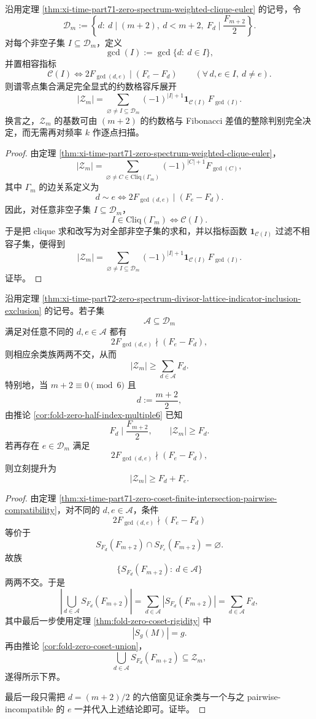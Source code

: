 \begin{theorem}[谱零点集合的约数格指标容斥公式]\label{thm:xi-time-part72-zero-spectrum-divisor-lattice-indicator-inclusion-exclusion}
沿用定理 \ref{thm:xi-time-part71-zero-spectrum-weighted-clique-euler} 的记号，令
\[
\mathcal D_m:=
\left\{
d:\ d\mid (m+2),\ d<m+2,\ F_d\mid \frac{F_{m+2}}{2}
\right\}.
\]
对每个非空子集 \(I\subseteq \mathcal D_m\)，定义
\[
\gcd(I):=\gcd\{d:\ d\in I\},
\]
并置相容指标
\[
\mathcal C(I)
\iff
2F_{\gcd(d,e)}\mid (F_e-F_d)
\qquad
(\forall\, d,e\in I,\ d\neq e).
\]
则谱零点集合满足完全显式的约数格容斥展开
\[
|\mathcal Z_m|
=
\sum_{\varnothing\neq I\subseteq \mathcal D_m}
(-1)^{|I|+1}\mathbf 1_{\mathcal C(I)}\,F_{\gcd(I)}.
\]
换言之，\(\mathcal Z_m\) 的基数可由 \((m+2)\) 的约数格与 Fibonacci 差值的整除判别完全决定，而无需再对频率 \(k\) 作逐点扫描。
\end{theorem}
\begin{proof}
由定理 \ref{thm:xi-time-part71-zero-spectrum-weighted-clique-euler}，
\[
|\mathcal Z_m|
=
\sum_{\varnothing\neq C\in \mathrm{Cliq}(\Gamma_m)}
(-1)^{|C|+1}F_{\gcd(C)},
\]
其中 \(\Gamma_m\) 的边关系定义为
\[
d\sim e
\iff
2F_{\gcd(d,e)}\mid (F_e-F_d).
\]
因此，对任意非空子集 \(I\subseteq \mathcal D_m\)，
\[
I\in \mathrm{Cliq}(\Gamma_m)
\iff
\mathcal C(I).
\]
于是把 clique 求和改写为对全部非空子集的求和，并以指标函数 \(\mathbf 1_{\mathcal C(I)}\) 过滤不相容子集，便得到
\[
|\mathcal Z_m|
=
\sum_{\varnothing\neq I\subseteq \mathcal D_m}
(-1)^{|I|+1}\mathbf 1_{\mathcal C(I)}\,F_{\gcd(I)}.
\]
证毕。
\end{proof}

\begin{corollary}\label{cor:xi-time-part72-zero-spectrum-pairwise-incompatible-linear-lower-bound}
沿用定理 \ref{thm:xi-time-part72-zero-spectrum-divisor-lattice-indicator-inclusion-exclusion} 的记号。若子集
\[
\mathcal A\subseteq \mathcal D_m
\]
满足对任意不同的 \(d,e\in\mathcal A\) 都有
\[
2F_{\gcd(d,e)}\nmid (F_e-F_d),
\]
则相应余类族两两不交，从而
\[
|\mathcal Z_m|
\ge
\sum_{d\in\mathcal A}F_d.
\]
特别地，当 \(m+2\equiv 0\pmod 6\) 且
\[
d:=\frac{m+2}{2},
\]
由推论 \ref{cor:fold-zero-half-index-multiple6} 已知
\[
F_d\mid \frac{F_{m+2}}{2},
\qquad
|\mathcal Z_m|\ge F_d.
\]
若再存在 \(e\in\mathcal D_m\) 满足
\[
2F_{\gcd(d,e)}\nmid (F_e-F_d),
\]
则立刻提升为
\[
|\mathcal Z_m|\ge F_d+F_e.
\]
\end{corollary}
\begin{proof}
由定理 \ref{thm:xi-time-part71-zero-coset-finite-intersection-pairwise-compatibility}，对不同的 \(d,e\in \mathcal A\)，条件
\[
2F_{\gcd(d,e)}\nmid (F_e-F_d)
\]
等价于
\[
S_{F_d}(F_{m+2})\cap S_{F_e}(F_{m+2})=\varnothing.
\]
故族
\[
\{S_{F_d}(F_{m+2}):\ d\in\mathcal A\}
\]
两两不交。于是
\[
\left|
\bigcup_{d\in\mathcal A}S_{F_d}(F_{m+2})
\right|
=
\sum_{d\in\mathcal A}|S_{F_d}(F_{m+2})|
=
\sum_{d\in\mathcal A}F_d,
\]
其中最后一步使用定理 \ref{thm:fold-zero-coset-rigidity} 中
\[
|S_g(M)|=g.
\]
再由推论 \ref{cor:fold-zero-coset-union}，
\[
\bigcup_{d\in\mathcal A}S_{F_d}(F_{m+2})
\subseteq
\mathcal Z_m,
\]
遂得所示下界。

最后一段只需把 \(d=(m+2)/2\) 的六倍窗见证余类与一个与之 pairwise-incompatible 的 \(e\) 一并代入上述结论即可。证毕。
\end{proof}

